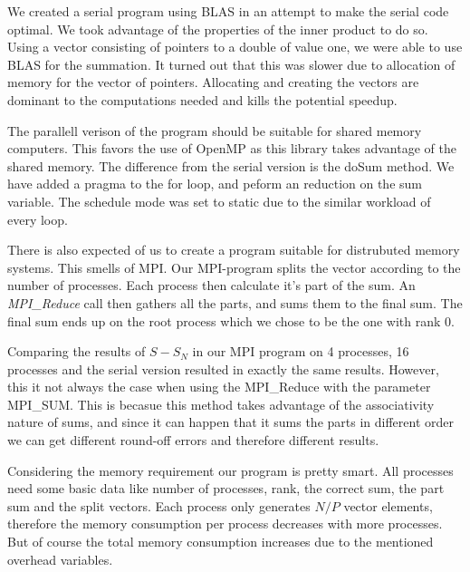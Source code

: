 \documentclass{article}
\begin{document}
    
    We created a serial program using BLAS in an attempt to make the serial code optimal. We took advantage of the properties of the inner product to do so. Using a vector consisting of pointers to a double of value one, we were able to use BLAS for the summation. It turned out that this was slower due to allocation of memory for the vector of pointers. Allocating and creating the vectors are dominant to the computations needed and kills the potential speedup.
    
    
    The parallell verison of the program should be suitable for shared memory computers. This favors the use of OpenMP as this library takes advantage of the shared memory. The difference from the serial version is the doSum method. We have added a pragma to the for loop, and peform an reduction on the sum variable. The schedule mode was set to static due to the similar workload of every loop. 
    
    
    
    There is also expected of us to create a program suitable for distrubuted memory systems. This smells of MPI. Our MPI-program splits the vector according to the number of processes. Each process then calculate it's part of the sum. An \textit{MPI\_Reduce} call then gathers all the parts, and sums them to the final sum. The final sum ends up on the root process which we chose to be the one with rank 0.
    
    
    
    Comparing the results of $ S-S_N $ in our MPI program on 4 processes, 16 processes and the serial version resulted in exactly the same results. However, this it not always the case when using the MPI\_Reduce with the parameter MPI\_SUM. This is becasue this method takes advantage of the associativity nature of sums, and since it can happen that it sums the parts in different order we can get different round-off errors and therefore different results.
    
    
    Considering the memory requirement our program is pretty smart. All processes need some basic data like number of processes, rank, the correct sum, the part sum and the split vectors. Each process only generates $ N/P $ vector elements, therefore the memory consumption per process decreases with more processes. But of course the total memory consumption increases due to the mentioned overhead variables.
    
\end{document}

